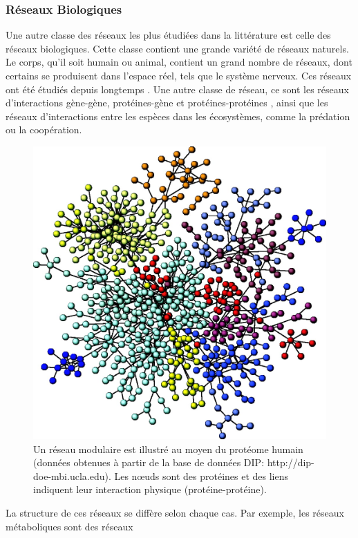 \subsubsection{Réseaux Biologiques}
  Une autre classe des  réseaux les plus étudiées dans la littérature est celle des réseaux biologiques. Cette classe
  contient une grande variété de réseaux naturels. Le corps, qu'il soit humain ou animal, contient un grand nombre de 
  réseaux, dont certains se produisent dans l'espace réel, tels que le système nerveux. Ces réseaux ont été étudiés 
  depuis longtemps \cite{WB1997}. Une autre classe de réseau, ce sont les réseaux d'interactions gène-gène, 
  protéines-gène et protéines-protéines \cite{DM2003}, ainsi que les réseaux d'interactions entre les espèces dans
  les écosystèmes, comme la prédation ou la coopération.\\
\begin{figure}[h!]
\centering
\includegraphics[scale=0.2]{./figures/PPI}
\caption{Un réseau modulaire est illustré au moyen du protéome humain (données obtenues à partir de la base
de données DIP: http://dip-doe-mbi.ucla.edu). Les nœuds sont des protéines et des liens indiquent leur 
interaction physique (protéine-protéine).}
\label{PPI}
\end{figure}
 La structure de ces réseaux se diffère selon chaque cas. Par exemple, les réseaux métaboliques sont des réseaux
